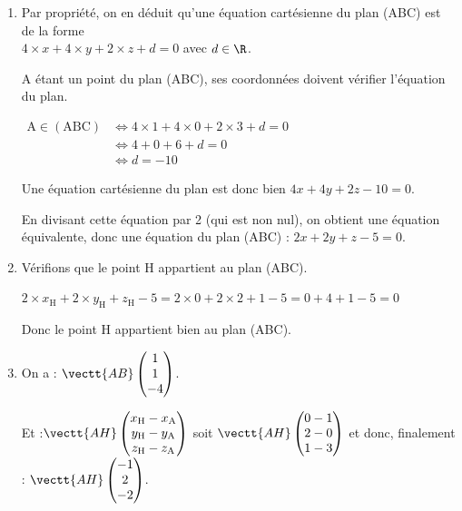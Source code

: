 \begin{enumerate}
	$\vect{n}$ est donc orthogonal à deux vecteurs non colinéaires qui forment une base du plan (ABC), donc il est normal au plan (ABC).



	\item 	Par propriété, on en déduit qu'une équation cartésienne du plan (ABC) est de la forme \\
	$4 \times x + 4 \times y +2  \times z+d=0$ avec $d \in \R$.

	A étant un point du plan (ABC), ses coordonnées doivent vérifier l'équation du plan.

	$\begin{aligned}
		\mathrm{A} \in (\mathrm{ABC})
		&\iff  4 \times 1 + 4\times 0  +2  \times 3 + d = 0\\
		&\iff 4 + 0 + 6 +  d = 0\\
		&\iff d = -10
	\end{aligned}$

	Une équation cartésienne du plan est donc bien \quad$4x + 4y  +2 z -10   = 0$.

	En divisant cette équation par 2 (qui est non nul), on obtient une équation équivalente, donc une équation du plan (ABC) : \quad  $2x + 2y  + z -5   = 0$.

	\item Vérifions que le point H appartient au plan (ABC).

	$2\times x_\mathrm{H}+2 \times y_\mathrm{H}+z_\mathrm{H}-5 = 2 \times 0 + 2\times 2 + 1 -5 = 0+4+1-5=0$

	Donc le point H appartient bien au plan (ABC).

	\item  On a :\quad
	$\vectt{AB}
	\begin{pmatrix}
		1\\
		1\\
		-4\\
	\end{pmatrix}$.

	Et :\quad $\vectt{AH}
	\begin{pmatrix}
		x_\mathrm{H} - x_\mathrm{A}\\
		y_\mathrm{H} - y_\mathrm{A}\\
		z_\mathrm{H} - z_\mathrm{A}\\
	\end{pmatrix}$ \quad soit \quad
	$\vectt{AH}
	\begin{pmatrix}
		0 - 1\\
		2- 0\\
		1-3
	\end{pmatrix}$
	\quad et donc, finalement :\quad
	$\vectt{AH}
	\begin{pmatrix}
		-1\\
		2\\
		-2\\
	\end{pmatrix}$.


\end{enumerate}
